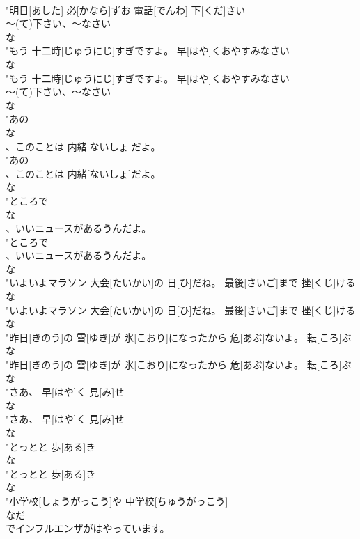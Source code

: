 \documentclass[8pt]{extreport}
\begin{document}
\begin{CJK}{UTF8}{min}
\\	"明日[あした] 必[かなら]ずお 電話[でんわ] 下[くだ]さい
\\	～(て)下さい、～なさい	
\\	な
\\	"もう 十二時[じゅうにじ]すぎですよ。 早[はや]くおやすみなさい
\\	な
\\	"もう 十二時[じゅうにじ]すぎですよ。 早[はや]くおやすみなさい
\\	～(て)下さい、～なさい	
\\	な
\\	"あの
\\	な
\\	、このことは 内緒[ないしょ]だよ。
\\	"あの
\\	、このことは 内緒[ないしょ]だよ。
\\	な
\\	"ところで
\\	な
\\	、いいニュースがあるうんだよ。
\\	"ところで
\\	、いいニュースがあるうんだよ。
\\	な
\\	"いよいよマラソン 大会[たいかい]の 日[ひ]だね。 最後[さいご]まで 挫[くじ]ける
\\	な
\\	"いよいよマラソン 大会[たいかい]の 日[ひ]だね。 最後[さいご]まで 挫[くじ]ける
\\	な
\\	"昨日[きのう]の 雪[ゆき]が 氷[こおり]になったから 危[あぶ]ないよ。 転[ころ]ぶ
\\	な
\\	"昨日[きのう]の 雪[ゆき]が 氷[こおり]になったから 危[あぶ]ないよ。 転[ころ]ぶ
\\	な
\\	"さあ、 早[はや]く 見[み]せ
\\	な
\\	"さあ、 早[はや]く 見[み]せ
\\	な
\\	"とっとと 歩[ある]き
\\	な
\\	"とっとと 歩[ある]き
\\	な
\\	"小学校[しょうがっこう]や 中学校[ちゅうがっこう]
\\	なだ
\\	でインフルエンザがはやっています。

\end{CJK}
\end{document}
